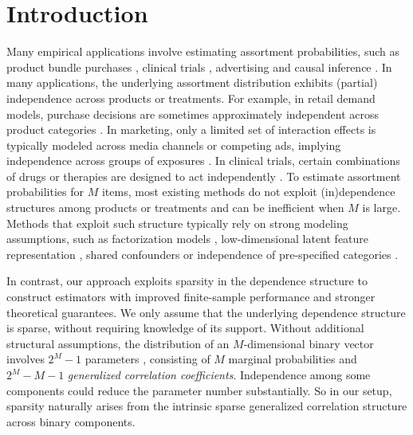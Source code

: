 \documentclass[11pt]{article}
\begin{document}
\section{Introduction}\label{sec-intro}
Many empirical applications involve estimating assortment probabilities, such as product bundle purchases \citep[e.g.][]{chung2003general,gabel2022product,blanchet2016markov,talluri2004revenue}, clinical trials \citep[e.g.][]{gueorguieva2001correlated,agresti2000strategies}, advertising \citep[e.g.][]{aouad2021display,li2025online} and causal inference \citep[e.g.][]{imbens2015causal,arkhangelsky2021double,fitzmaurice2008longitudinal}. In many applications, the underlying assortment distribution exhibits (partial) independence across products or treatments. For example, in retail demand models, purchase decisions are sometimes approximately independent across product categories \citep[e.g.][]{donnelly2021counterfactual}. In marketing, only a limited set of interaction effects is typically modeled across media channels or competing ads, implying independence across groups of exposures \citep[e.g.][]{zantedeschi2017measuring, danaher2008effect}. In clinical trials, certain combinations of drugs or therapies are designed to act independently \citep[e.g.][]{pomeroy2022drug, plana2022independent}. To estimate assortment probabilities for $M$ items, most existing methods do not exploit (in)dependence structures among products or treatments and can be inefficient when $M$ is large. Methods that exploit such structure typically rely on strong modeling assumptions, such as factorization models \citep[e.g.][]{gopalan2014bayesian}, low-dimensional latent feature representation \citep[e.g.][]{ruiz2020shopper}, shared confounders \citep[e.g.][]{ranganath2018multiple} or independence of pre-specified categories \citep[e.g.][]{donnelly2021counterfactual}.

In contrast, our approach exploits sparsity in the dependence structure to construct estimators with improved finite-sample performance and stronger theoretical guarantees. We only assume that the underlying dependence structure is sparse, without requiring knowledge of its support. Without additional structural assumptions, the distribution of an $M$-dimensional binary vector involves $2^M - 1$ parameters \citep{bahadur1959representation}, consisting of $M$ marginal probabilities and $2^M - M - 1$ \emph{generalized correlation coefficients}. Independence among some components could reduce the parameter number substantially. So in our setup, sparsity naturally arises from the intrinsic sparse generalized correlation structure across binary components.
\end{document}
